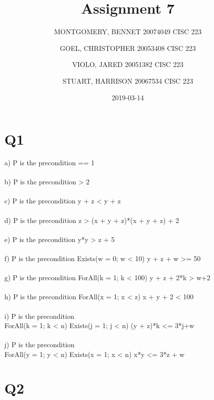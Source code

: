 \documentclass{article}
\title{Assignment 7}
\date{2019-03-14}
\author{MONTGOMERY, BENNET 20074049 CISC 223\\
		\and GOEL, CHRISTOPHER 20053408 CISC 223\\
		\and VIOLO, JARED 20051382 CISC 223\\
		\and STUART, HARRISON 20067534 CISC 223
		}
\begin{document}
	\maketitle
	
	\section*{Q1}
	a) {\selectfont P} is the precondition { == 1}
	\\\\b) {\selectfont P} is the precondition { > 2}
	\\\\c) {\selectfont P} is the precondition {\selectfont y + z < y + z}
	\\\\d) {\selectfont P} is the precondition {\selectfont z > (x + y + z)*(x + y + z) + 2}
	\\\\e) {\selectfont P} is the precondition {\selectfont y*y > z + 5}
	\\\\f) {\selectfont P} is the precondition {\selectfont Exists(w = 0; w < 10) y + z + w >= 50}
	\\\\g) {\selectfont P} is the precondition {\selectfont ForAll(k = 1; k < 100) y + z + 2*k > w+2}
	\\\\h) {\selectfont P} is the precondition {\selectfont ForAll(x = 1; x < z) x + y + 2 < 100}
	\\\\i) {\selectfont P} is the precondition \\{\selectfont ForAll(k = 1; k < n) Exists(j = 1; j < n) (y + z)*k <= 3*j+w}
	\\\\j) {\selectfont P} is the precondition \\{\selectfont ForAll(y = 1; y < n) Exists(x = 1; x < n) x*y <= 3*z + w}
	
	\section*{Q2}
\end{document}
